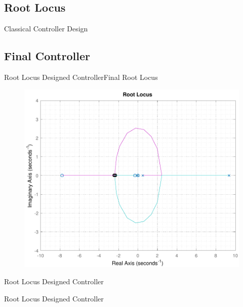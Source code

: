 \subsection{Root Locus}
\begin{frame}{Classical Controller Design}{}
	
	\begin{figure}
		
	\end{figure}
\end{frame}

\subsection{Final Controller}
\begin{frame}{Root Locus Designed Controller}{Final Root Locus}
\begin{figure}
	\includegraphics[scale=.56]{Pictures/RLController}
	\centering
\end{figure}		
\end{frame}

\begin{frame}{Root Locus Designed Controller}{}
	
	\begin{figure}
		
	\end{figure}
	
\end{frame}

\begin{frame}{Root Locus Designed Controller}{}
	
	\begin{figure}
		
	\end{figure}
	
\end{frame}
